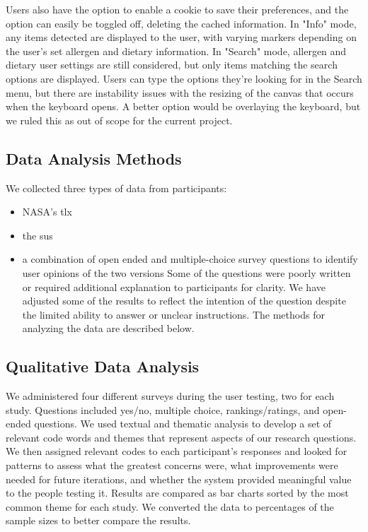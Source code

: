 \documentclass[thesis]{fputhesis}
\begin{document}
\begin{body}
Users also have the option to enable a cookie to save their preferences, and the option can easily be toggled off, deleting the cached information. 
In "Info" mode, any items detected are displayed to the user, with varying markers depending on the user's set allergen and dietary information. In "Search" mode, allergen and dietary user settings are still considered, but only items matching the search options are displayed. 
Users can type the options they're looking for in the Search menu, but there are instability issues with the resizing of the canvas that occurs when the keyboard opens. A better option would be overlaying the keyboard, but we ruled this as out of scope for the current project.
\filbreak
\begin{samepage}
\section{Data Analysis Methods}
We collected three types of data from participants: 
\begin{itemize}
    \item NASA's \acrfull{tlx} 
    \item the \acrfull{sus}
    \item a combination of open ended and multiple-choice survey questions to identify user opinions of the two versions
Some of the questions were poorly written or required additional explanation to participants for clarity. We have adjusted some of the results to reflect the intention of the question despite the limited ability to answer or unclear instructions. The methods for analyzing the data are described below.
\end{itemize}

\end{samepage}
\subsection{Qualitative Data Analysis}
We administered four different surveys during the user testing, two for each study. Questions included yes/no, multiple choice, rankings/ratings, and open-ended questions. We used textual and thematic analysis to develop a set of relevant code words and themes that represent aspects of our research questions. We then assigned relevant codes to each participant's responses and looked for patterns to assess what the greatest concerns were, what improvements were needed for future iterations, and whether the system provided meaningful value to the people testing it. Results are compared as bar charts sorted by the most common theme for each study. We converted the data to percentages of the sample sizes to better compare the results. 


\end{body}
\end{document}
